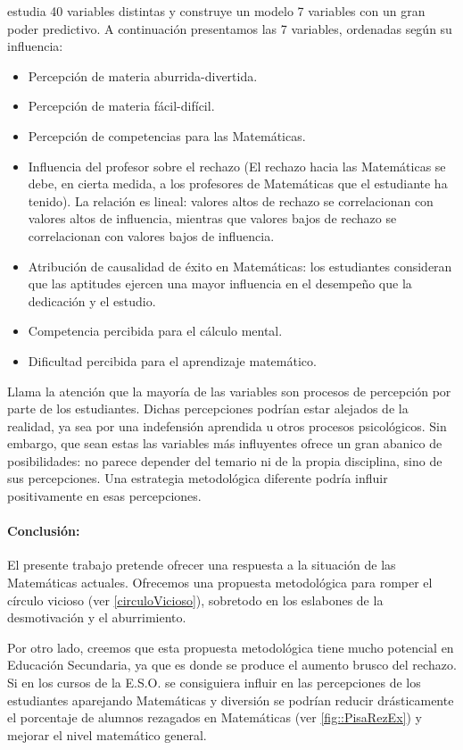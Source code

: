 \cite{ActitudesHaciaMates} estudia 40 variables distintas y construye un modelo 7 variables con un gran poder predictivo.
%
A continuación presentamos las 7 variables, ordenadas según su influencia: 
%
\begin{itemize}
\vspace{-0.4cm}\item Percepción de materia aburrida-divertida.
\vspace{-0.4cm}\item Percepción de materia fácil-difícil.
\vspace{-0.4cm}\item Percepción de competencias para las Matemáticas.
\vspace{-0.4cm}\item Influencia del profesor sobre el rechazo (El rechazo hacia las Matemáticas se debe, en cierta medida, a los profesores de Matemáticas que el estudiante ha tenido). La relación es lineal: valores altos de rechazo se correlacionan con valores altos de influencia, mientras que valores bajos de rechazo se correlacionan con valores bajos de influencia.
\vspace{-0.4cm}\item Atribución de causalidad de éxito en Matemáticas: los estudiantes consideran que las aptitudes ejercen una mayor influencia en el desempeño que la dedicación y el estudio.
\vspace{-0.4cm}\item Competencia percibida para el cálculo mental.
\vspace{-0.4cm}\item Dificultad percibida para el aprendizaje matemático.
\end{itemize}

Llama la atención que la mayoría de las variables son procesos de percepción por parte de los estudiantes.
%
Dichas percepciones podrían estar alejados de la realidad, ya sea por una indefensión aprendida u otros procesos psicológicos.
%
Sin embargo, que sean estas las variables más influyentes ofrece un gran abanico de posibilidades: no parece depender del temario ni de la propia disciplina, sino de sus percepciones.
%
Una estrategia metodológica diferente podría influir  positivamente en esas percepciones.

\paragraph{Conclusión:} El presente trabajo pretende ofrecer una respuesta a la situación de las Matemáticas actuales.
%
Ofrecemos una propuesta metodológica para romper el círculo vicioso (ver \ref{circuloVicioso}), sobretodo en los eslabones de la desmotivación y el aburrimiento.

Por otro lado, creemos que esta propuesta metodológica tiene mucho potencial en Educación Secundaria, ya que es donde se produce el aumento brusco del rechazo.
%
Si en los cursos de la E.S.O. se consiguiera influir en las percepciones de los estudiantes aparejando Matemáticas y diversión se podrían reducir drásticamente el porcentaje de alumnos rezagados en Matemáticas (ver \ref{fig::PisaRezEx}) y mejorar el nivel matemático general.

